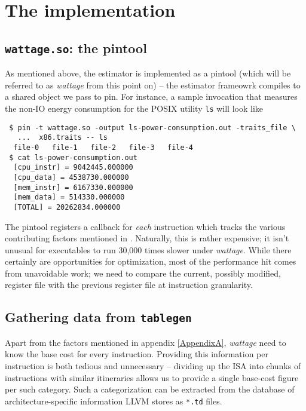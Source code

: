 \section{The implementation}

\subsection{\texttt{wattage.so}: the pintool}

As mentioned above, the estimator is implemented as a pintool (which
will be referred to as \textit{wattage} from this point on) -- the
estimator frameowrk compiles to a shared object we pass to pin.  For
instance, a sample invocation that measures the non-IO energy
consumption for the POSIX utility \texttt{ls} will look like

\begin{verbatim}
 $ pin -t wattage.so -output ls-power-consumption.out -traits_file \
   ...  x86.traits -- ls
  file-0   file-1   file-2   file-3   file-4
 $ cat ls-power-consumption.out
  [cpu_instr] = 9042445.000000
  [cpu_data] = 4538730.000000
  [mem_instr] = 6167330.000000
  [mem_data] = 514330.000000
  [TOTAL] = 20262834.000000
\end{verbatim}

The pintool registers a callback for \textit{each} instruction which
tracks the various contributing factors mentioned in \cite{steinke}.
Naturally, this is rather expensive; it isn't unusual for executables
to run 30,000 times slower under \textit{wattage}.  While there
certainly are opportunities for optimization, most of the performance
hit comes from unavoidable work; we need to compare the current,
possibly modified, register file with the previous register file at
instruction granularity.

\subsection{Gathering data from \texttt{tablegen}}

Apart from the factors mentioned in appendix \ref{AppendixA},
\textit{wattage} need to know the base cost for every instruction.
Providing this information per instruction is both tedious and
unnecessary -- dividing up the ISA into chunks of instructions with
similar itineraries allows us to provide a single base-cost figure per
such category.  Such a categorization can be extracted from the
database of architecture-specific information LLVM stores as
\texttt{*.td} files.

